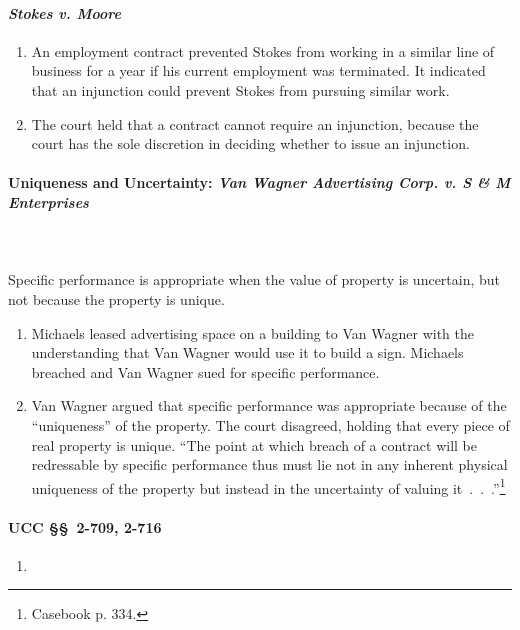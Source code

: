 \paragraph{\emph{Stokes v. Moore}}

\begin{enumerate}
    \item An employment contract prevented Stokes from working in a similar 
    line of business for a year if his current employment was terminated. It 
    indicated that an injunction could prevent Stokes from pursuing similar 
    work.
    \item The court held that a contract cannot require an injunction, because 
    the court has the sole discretion in deciding whether to issue an 
    injunction.
\end{enumerate}

\paragraph{Uniqueness and Uncertainty: \emph{Van Wagner Advertising Corp. v. S 
\& M Enterprises}}
~\\\\
Specific performance is appropriate when the value of property is uncertain, 
but not because the property is unique.

\begin{enumerate}
    \item Michaels leased advertising space on a building to Van Wagner with 
    the understanding that Van Wagner would use it to build a sign. Michaels 
    breached and Van Wagner sued for specific performance.
    \item Van Wagner argued that specific performance was appropriate because 
    of the ``uniqueness'' of the property. The court disagreed, holding that 
    every piece of real property is unique. ``The point at which breach of a 
    contract will be redressable by specific performance thus must lie not in 
    any inherent physical uniqueness of the property but instead in the 
    uncertainty of valuing it~.~.~.''\footnote{Casebook p. 334.}
\end{enumerate}

\paragraph{UCC \S\S\ 2-709, 2-716}

\begin{enumerate}
    \item %
\end{enumerate}

